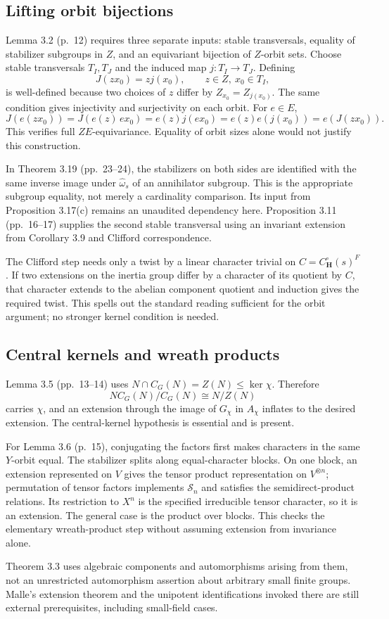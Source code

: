 \documentclass[10pt]{article}
\begin{document}
\subsection*{Lifting orbit bijections}
Lemma 3.2 (p. 12) requires three separate inputs: stable transversals, equality of stabilizer subgroups in \(Z\), and an equivariant bijection of \(Z\)-orbit sets. Choose stable transversals \(T_I,T_J\) and the induced map \(j:T_I\to T_J\). Defining \[J(zx_0)=zj(x_0),\qquad z\in Z,\ x_0\in T_I,\] is well-defined because two choices of \(z\) differ by \(Z_{x_0}=Z_{j(x_0)}\). The same condition gives injectivity and surjectivity on each orbit. For \(e\in E\), \[J(e(zx_0))=J(e(z)\,ex_0)=e(z)j(ex_0)=e(z)e(j(x_0))=e(J(zx_0)).\] This verifies full \(ZE\)-equivariance. Equality of orbit sizes alone would not justify this construction.\par
In Theorem 3.19 (pp. 23–24), the stabilizers on both sides are identified with the same inverse image under \(\widehat\omega_s\) of an annihilator subgroup. This is the appropriate subgroup equality, not merely a cardinality comparison. Its input from Proposition 3.17(c) remains an unaudited dependency here. Proposition 3.11 (pp. 16–17) supplies the second stable transversal using an invariant extension from Corollary 3.9 and Clifford correspondence.\par
The Clifford step needs only a twist by a linear character trivial on \(C=C_{\mathbf H}^{\circ}(s)^F\). If two extensions on the inertia group differ by a character of its quotient by \(C\), that character extends to the abelian component quotient and induction gives the required twist. This spells out the standard reading sufficient for the orbit argument; no stronger kernel condition is needed.\par
\subsection*{Central kernels and wreath products}
Lemma 3.5 (pp. 13–14) uses \(N\cap C_G(N)=Z(N)\leq\ker\chi\). Therefore \[NC_G(N)/C_G(N)\cong N/Z(N)\] carries \(\chi\), and an extension through the image of \(G_\chi\) in \(A_\chi\) inflates to the desired extension. The central-kernel hypothesis is essential and is present.\par
For Lemma 3.6 (p. 15), conjugating the factors first makes characters in the same \(Y\)-orbit equal. The stabilizer splits along equal-character blocks. On one block, an extension represented on \(V\) gives the tensor product representation on \(V^{\otimes n}\); permutation of tensor factors implements \(\mathcal S_n\) and satisfies the semidirect-product relations. Its restriction to \(X^n\) is the specified irreducible tensor character, so it is an extension. The general case is the product over blocks. This checks the elementary wreath-product step without assuming extension from invariance alone.\par
Theorem 3.3 uses algebraic components and automorphisms arising from them, not an unrestricted automorphism assertion about arbitrary small finite groups. Malle’s extension theorem and the unipotent identifications invoked there are still external prerequisites, including small-field cases.\par
\end{document}
